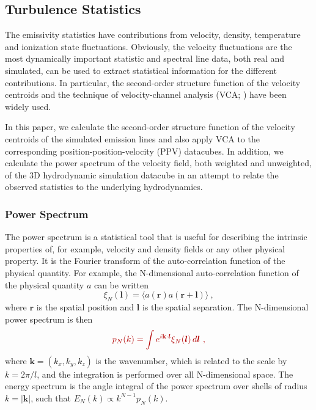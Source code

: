 \documentclass[useAMS,usenatbib]{mn2e}
\providecommand{\DIFadd}[1]{{\protect\color{red!70!black}#1}} %
\providecommand{\DIFdel}[1]{} %
\providecommand{\DIFaddbegin}{\color{red!70!black}} %
\providecommand{\DIFaddend}{\color{black}} %
\providecommand{\DIFdelbegin}{} %
\providecommand{\DIFdelend}{} %
\begin{document}
\subsection{Turbulence Statistics}
\label{subsec:turbstats}
The emissivity statistics have contributions from velocity, density,
temperature and ionization state fluctuations. Obviously, the velocity
fluctuations are the most dynamically important statistic and spectral
line data, both real and simulated, can be used to extract statistical
information for the different contributions. In particular, the
second-order structure function of the velocity centroids and the
technique of velocity-channel analysis (VCA; \citealp{2000ApJ...537..720L}) have been widely used.

In this paper, we calculate the second-order structure function
of the velocity centroids of the simulated emission lines and also apply
VCA to the corresponding position-position-velocity (PPV)
datacubes. In addition, we calculate the power spectrum of the velocity field,
both weighted and unweighted, of the 3D hydrodynamic simulation
datacube in an attempt to relate the observed statistics to the
underlying hydrodynamics.

\subsubsection{Power Spectrum}

The power spectrum is a statistical tool that is useful for describing
the intrinsic properties of, for example, velocity and density fields
or any other physical property. It is the Fourier
transform of the auto-correlation function of the physical
quantity. For example, the N-dimensional auto-correlation function of the
physical quantity $a$ can be written
\begin{equation}
  \xi_N(\boldsymbol{l}) = \langle
  a(\mathbf{r})a(\mathbf{r}+\boldsymbol{l})\rangle \ ,
\label{eq:corrfn}
\end{equation}
where $\mathbf{r}$ is the spatial position and $\boldsymbol{l}$ is the
spatial separation. The N-dimensional power spectrum is then
\DIFdelbegin \begin{displaymath}\DIFdel{
  p_N(k) = \int e^{i\mathbf{k}\cdot\boldsymbol{l}} \xi_N{\boldsymbol{l}} \,
  d\boldsymbol{l} \ ,
}\end{displaymath}
\DIFdelend \DIFaddbegin \begin{equation}\DIFadd{
  p_N(k) = \int e^{i\mathbf{k}\cdot\boldsymbol{l}} \xi_N(}{\DIFadd{\boldsymbol{l}}}\DIFadd{) \,
  d\boldsymbol{l} \ ,
}\end{equation}
\DIFaddend where $\mathbf{k}  = (k_x,k_y,k_z)$ is the wavenumber, which is related to the scale by
$k = 2\pi/l$, and the integration is performed over all N-dimensional
space. The energy spectrum is the angle integral of
the power spectrum over shells of radius $k = |\mathbf{k} |$, such that $E_N(k) \propto k^{N-1} p_N(k)$.
\end{document}
